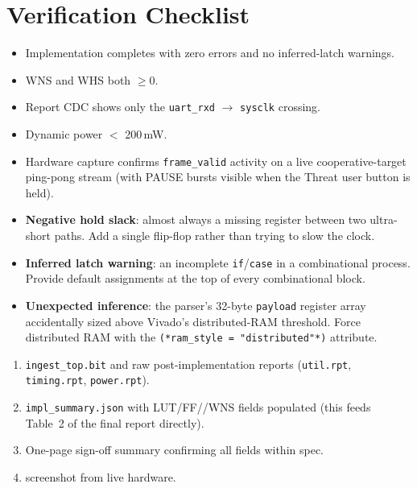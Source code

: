 \documentclass[11pt,letterpaper]{article}
\begin{document}
\newpage
\section{Verification Checklist}
\begin{itemize}[leftmargin=2em]
	\item[$\square$] Implementation completes with zero errors and no inferred-latch warnings.
	\item[$\square$] WNS and WHS both $\geq 0$.
	\item[$\square$] Report CDC shows only the \texttt{uart\_rxd} $\to$ \texttt{sysclk} crossing.
	\item[$\square$] Dynamic power $<$ 200\,mW.
	\item[$\square$] Hardware \ILA{} capture confirms \texttt{frame\_valid} activity on a live cooperative-target ping-pong stream (with PAUSE bursts visible when the Threat user button is held).
\end{itemize}

\begin{tcolorbox}[warning={Common Pitfalls}]
	\begin{itemize}[leftmargin=1.2em]
		\item \textbf{Negative hold slack}: almost always a missing register between two ultra-short paths. Add a single flip-flop rather than trying to slow the clock.
		\item \textbf{Inferred latch warning}: an incomplete \texttt{if}/\texttt{case} in a combinational process. Provide default assignments at the top of every combinational block.
		\item \textbf{Unexpected \BRAM{} inference}: the parser's 32-byte \texttt{payload} register array accidentally sized above Vivado's distributed-\mbox{RAM} threshold. Force distributed \mbox{RAM} with the \texttt{(*ram\_style = "distributed"*)} attribute.
	\end{itemize}
\end{tcolorbox}

\begin{tcolorbox}[deliverable={Lab Handout 2-H Deliverable}]
	\begin{enumerate}[leftmargin=1.2em]
		\item \texttt{ingest\_top.bit} and raw post-implementation reports (\texttt{util.rpt}, \texttt{timing.rpt}, \texttt{power.rpt}).
		\item \texttt{impl\_summary.json} with \mbox{LUT}/\mbox{FF}/\BRAM{}/WNS fields populated (this feeds Table~2 of the final report directly).
		\item One-page sign-off summary confirming all fields within spec.
		\item \ILA{} screenshot from live hardware.
	\end{enumerate}
\end{tcolorbox}

\printhandoutglossary
\end{document}
